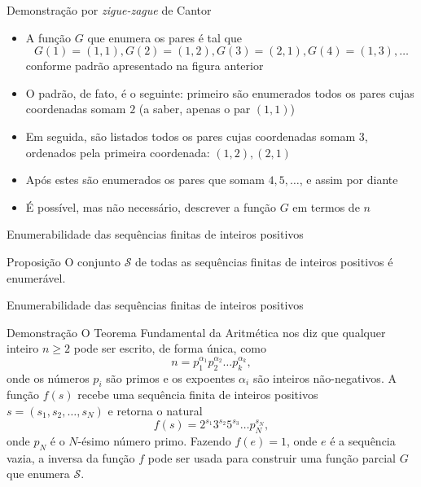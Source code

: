 \begin{frame}[fragile]{Demonstração por {\it zigue-zague} de Cantor} 

    \begin{itemize}
        \item A função $G$ que enumera os pares é tal que 
        \[
            G(1) = (1, 1), G(2) = (1, 2), G(3) = (2, 1), G(4) = (1, 3), \ldots
        \]
        conforme padrão apresentado na figura anterior

        \item O padrão, de fato, é o seguinte: primeiro são enumerados todos os pares cujas
            coordenadas somam $2$ (a saber, apenas o par $(1, 1)$)

        \item Em seguida, são listados todos os pares cujas coordenadas somam $3$, ordenados
            pela primeira coordenada: $(1, 2), (2, 1)$

        \item Após estes são enumerados os pares que somam $4, 5, \ldots$, e assim por diante

        \item É possível, mas não necessário, descrever a função $G$ em termos de $n$
    \end{itemize}

\end{frame}

\begin{frame}[fragile]{Enumerabilidade das sequências finitas de inteiros positivos}

    \begin{block}{Proposição}
        O conjunto $\mathcal{S}$ de todas as sequências finitas de inteiros positivos é enumerável.
    \end{block}
\end{frame}

\begin{frame}[fragile]{Enumerabilidade das sequências finitas de inteiros positivos}
    \begin{block}{Demonstração}
        O Teorema Fundamental da Aritmética nos diz que qualquer inteiro $n\geq 2$ pode ser 
        escrito, de forma única, como
        \[
            n = p_1^{\alpha_1}p_2^{\alpha_2}\ldots p_k^{\alpha_k},
        \]
        onde os números $p_i$ são primos e os expoentes $\alpha_i$ são inteiros não-negativos.
        A função $f(s)$ recebe uma sequência finita de inteiros positivos 
        $s = (s_1, s_2, \ldots, s_N)$ e retorna o natural
        \[
            f(s) = 2^{s_1}3^{s_2}5^{s_3}\ldots p_N^{s_N},
        \]
        onde $p_N$ é o $N$-ésimo número primo. 
        Fazendo $f(e) = 1$, onde $e$ é a sequência vazia, a inversa da função $f$ pode ser usada
        para construir uma função parcial $G$ que enumera $\mathcal{S}$.
    \end{block}
    
\end{frame}

